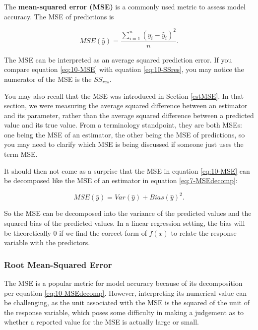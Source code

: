 \documentclass[
]{book}
\begin{document}
The \textbf{mean-squared error (MSE)} is a commonly used metric to assess model accuracy. The MSE of predictions is

\begin{equation} 
MSE(\hat{y}) = \frac{\sum_{i=1}^n (y_i - \hat{y}_i)^2}{n}.
\label{eq:10-MSE}
\end{equation}

The MSE can be interpreted as an average squared prediction error. If you compare equation \eqref{eq:10-MSE} with equation \eqref{eq:10-SSres}, you may notice the numerator of the MSE is the \(SS_{res}\).

You may also recall that the MSE was introduced in Section \ref{estMSE}. In that section, we were measuring the average squared difference between an estimator and its parameter, rather than the average squared difference between a predicted value and its true value. From a terminology standpoint, they are both MSEs: one being the MSE of an estimator, the other being the MSE of predictions, so you may need to clarify which MSE is being discussed if someone just uses the term MSE.

It should then not come as a surprise that the MSE in equation \eqref{eq:10-MSE} can be decomposed like the MSE of an estimator in equation \eqref{eq:7-MSEdecomp}:

\begin{equation} 
MSE(\hat{y}) = Var(\hat{y}) + Bias(\hat{y})^2.
\label{eq:10-MSEdecomp}
\end{equation}

So the MSE can be decomposed into the variance of the predicted values and the squared bias of the predicted values. In a linear regression setting, the bias will be theoretically 0 if we find the correct form of \(f(x)\) to relate the response variable with the predictors.

\hypertarget{root-mean-squared-error}{%
\subsubsection{Root Mean-Squared Error}\label{root-mean-squared-error}}

The MSE is a popular metric for model accuracy because of its decomposition per equation \eqref{eq:10-MSEdecomp}. However, interpreting its numerical value can be challenging, as the unit associated with the MSE is the squared of the unit of the response variable, which poses some difficulty in making a judgement as to whether a reported value for the MSE is actually large or small.
\end{document}
